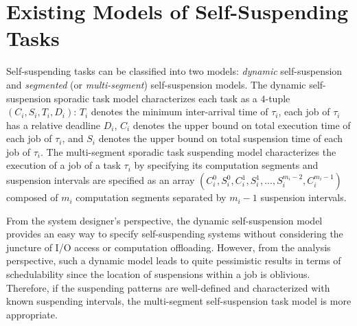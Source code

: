 \section{Existing Models of Self-Suspending Tasks}
  
Self-suspending tasks can be classified into two models: \emph{dynamic} self-suspension and \emph{segmented} (or \emph{multi-segment}) self-suspension models. 
The dynamic self-suspension sporadic task model characterizes each task as a $4$-tuple $(C_i,S_i,T_i,D_i)$: $T_i$ denotes the minimum inter-arrival time of $\tau_i$, each job of $\tau_i$ has a relative deadline $D_i$,
$C_i$ denotes the upper bound on total execution time of each job of $\tau_i$,
and $S_i$ denotes the upper bound on total suspension time of each job of $\tau_i$. The multi-segment sporadic task suspending model characterizes the execution of a job of a task $\tau_i$ by  specifying its computation segments and suspension intervals are specified as an array
$(C_{i}^0,S_{i}^0,C_{i}^1,S_{i}^1,...,S_{i}^{m_i-2},C_{i}^{m_i-1})$ composed of $m_i$ computation segments separated by $m_i-1$ suspension intervals. 

From the system designer's perspective, the dynamic self-suspension model provides an easy way to specify self-suspending systems without considering the juncture of I/O access or computation offloading. 
However, from the analysis perspective, such a  dynamic model leads to quite pessimistic results in terms of schedulability since the location of suspensions within a job is oblivious. Therefore, if the suspending patterns are well-defined and characterized with known suspending intervals, the multi-segment self-suspension task model is more appropriate.   
  
  